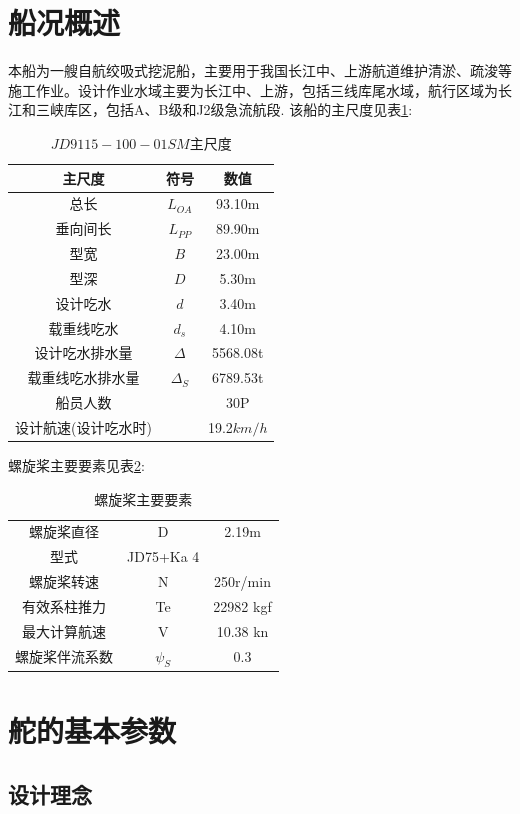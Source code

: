 \documentclass[a4paper,UTF8]{article}
\begin{document}
\section{船况概述}
本船为一艘自航绞吸式挖泥船，主要用于我国长江中、上游航道维护清淤、疏浚等施工作业。设计作业水域主要为长江中、上游，包括三线库尾水域，航行区域为长江和三峡库区，包括A、B级和J2级急流航段.
该船的主尺度见表\ref{tab:zcd}:
\begin{table}[!htbp]
	\centering
	\begin{tabular}{ccc}

		\hline 
		主尺度 & 符号 & 数值\\
		\hline
		总长 & $L_{OA}$ & 93.10m\\
		垂向间长 & $L_{PP}$ & 89.90m\\
		型宽 & $B$ & 23.00m\\
		型深	& $D$ & 5.30m\\
		设计吃水 & $d$ & 3.40m\\
		载重线吃水 & $d_s$ & 4.10m\\
		设计吃水排水量 & $\Delta$ & 5568.08t\\
		载重线吃水排水量 & $\Delta_S$ & 6789.53t\\
		船员人数	& & 30P\\
		设计航速(设计吃水时) & & 19.2$km/h$\\
		\hline
	\end{tabular}
	\caption{$JD9115-100-01SM$主尺度}
	\label{tab:zcd}
\end{table}
螺旋桨主要要素见表\ref{tab:propeller}:
\begin{table}[!htbp]
	\centering
	\begin{tabular}{ccc}
		\hline
		螺旋桨直径 & D & 2.19m \\
		型式 & JD75+Ka 4 & \\
		螺旋桨转速 & N & 250r/min \\
		有效系柱推力 & Te & 22982 kgf\\
		最大计算航速 & V & 10.38 kn\\
		螺旋桨伴流系数 & $\psi_{S}$ & 0.3\\
		\hline	
	\end{tabular}
\caption{螺旋桨主要要素}
\label{tab:propeller}
\end{table}

\section{舵的基本参数}
\subsection{设计理念}
\end{document}
